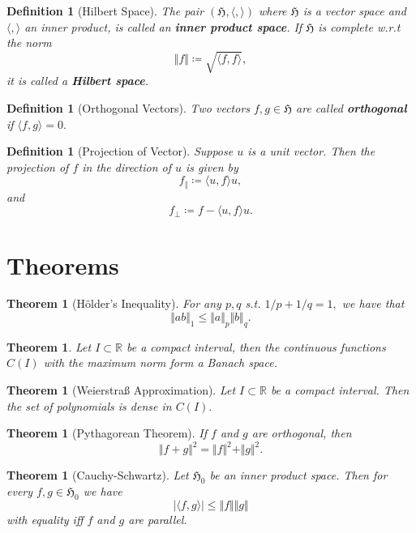 \documentclass[10pt]{article}
\newtheorem{theorem}[]{Theorem}
\newtheorem{definition}[]{Definition}
\begin{document}
\begin{definition}[Hilbert Space]
    The pair $(\mathfrak{H},\langle ,\rangle)$ where $\mathfrak{H}$ is a vector space and $\langle ,\rangle$ 
    an inner product, is called an \textbf{inner product space}. If $\mathfrak{H}$ is complete w.r.t the norm
    \[\Vert f\Vert \coloneqq \sqrt{\langle f,f\rangle},\]
    it is called a \textbf{Hilbert space}.
\end{definition}

\begin{definition}[Orthogonal Vectors]
    Two vectors $f,g\in\mathfrak{H}$ are called \textbf{orthogonal} if $\langle f,g\rangle =0.$
\end{definition}

\begin{definition}[Projection of Vector]
    Suppose $u$ is a unit vector. Then the projection of $f$ in the direction of $u$ is given by
    \[f_\Vert \coloneqq \langle u,f\rangle u,\]
    and
    \[f_\perp \coloneqq f-\langle u,f\rangle u.\]
\end{definition}

\section{Theorems}

\begin{theorem}[Hölder's Inequality]
    For any $p,q$ s.t. $1/p +1/q = 1,$ we have that
    \[\Vert ab\Vert_1 \le \Vert a\Vert_p\Vert b\Vert_q.\]
\end{theorem}

\begin{theorem}
    Let $I\subset \mathbb{R}$ be a compact interval, then the continuous functions $C(I)$ with the maximum norm     form a Banach space. 
\end{theorem}

\begin{theorem}[Weierstraß Approximation]
    Let $I\subset\mathbb{R}$ be a compact interval. Then the set of polynomials is dense in $C(I).$
\end{theorem}

\begin{theorem}[Pythagorean Theorem]
    If $f$ and $g$ are orthogonal, then
    \[\Vert f+g\Vert^2 =\Vert f\Vert^2 +\Vert g\Vert^2.\]
\end{theorem}

\begin{theorem}[Cauchy-Schwartz]
    Let $\mathfrak{H}_0$ be an inner product space. Then for every $f,g\in\mathfrak{H}_0$ we have
    \[|\langle f,g\rangle|\le \Vert f\Vert\Vert g\Vert\]
    with equality iff $f$ and $g$ are parallel.
\end{theorem}
\end{document}
